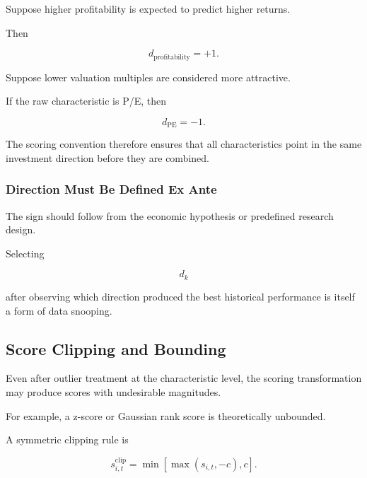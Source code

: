 \documentclass[11pt,a4paper]{article}
\begin{document}
Suppose higher profitability is expected to predict higher returns.

Then

\begin{equation}
d_{\mathrm{profitability}}=+1.
\end{equation}

Suppose lower valuation multiples are considered more attractive.

If the raw characteristic is P/E, then

\begin{equation}
d_{\mathrm{PE}}=-1.
\end{equation}

The scoring convention therefore ensures that all characteristics point in the
same investment direction before they are combined.


\subsubsection{Direction Must Be Defined Ex Ante}

The sign should follow from the economic hypothesis or predefined research
design.

Selecting

\begin{equation}
d_k
\end{equation}

after observing which direction produced the best historical performance is
itself a form of data snooping.


\subsection{Score Clipping and Bounding}
\label{subsec:score_clipping}

Even after outlier treatment at the characteristic level, the scoring
transformation may produce scores with undesirable magnitudes.

For example, a z-score or Gaussian rank score is theoretically unbounded.

A symmetric clipping rule is

\begin{equation}
\boxed{
s_{i,t}^{\mathrm{clip}}
=
\min
\left[
\max
\left(
s_{i,t},
-c
\right),
c
\right].
}
\end{equation}
\end{document}

